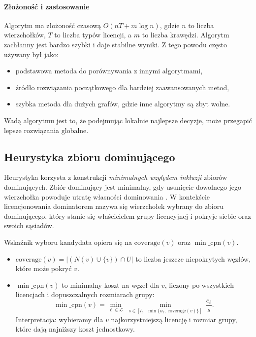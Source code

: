 \paragraph{Złożoność i zastosowanie}
Algorytm ma złożoność czasową $O(nT + m\log n)$, gdzie $n$ to liczba wierzchołków, $T$ to liczba typów licencji, a $m$ to liczba krawędzi.
Algorytm zachłanny jest bardzo szybki i daje stabilne wyniki. Z tego powodu często używany był jako:
\begin{itemize}
  \item podstawowa metoda do porównywania z innymi algorytmami,
  \item źródło rozwiązania początkowego dla bardziej zaawansowanych metod,
  \item szybka metoda dla dużych grafów, gdzie inne algorytmy są zbyt wolne.
\end{itemize}
Wadą algorytmu jest to, że podejmując lokalnie najlepsze decyzje, może przegapić lepsze rozwiązania globalne.
\subsection{Heurystyka zbioru dominującego}\label{subsec:ds}

Heurystyka korzysta z konstrukcji \emph{minimalnych względem inkluzji} zbiorów dominujących. Zbiór dominujący jest minimalny, gdy usunięcie dowolnego jego wierzchołka powoduje utratę własności dominowania \cite{haynes1998domination}. W kontekście licencjonowania dominatorem nazywa się wierzchołek wybrany do zbioru dominującego, który stanie się właścicielem grupy licencyjnej i pokryje siebie oraz swoich sąsiadów.

Wskaźnik wyboru kandydata opiera się na \(\mathrm{coverage}(v)\) oraz \(\min\_\mathrm{cpn}(v)\).
\begin{itemize}
  \item \(\mathrm{coverage}(v)=|(N(v)\cup\{v\})\cap U|\) to liczba jeszcze niepokrytych węzłów, które może pokryć \(v\).
  \item \(\min\_\mathrm{cpn}(v)\) to minimalny koszt na węzeł dla \(v\), liczony po wszystkich licencjach i dopuszczalnych rozmiarach grupy:
        \[
          \min\_\mathrm{cpn}(v)=\min_{\ell\in\mathcal{L}}\;\min_{s\in[l_\ell,\;\min\{u_\ell,\ \mathrm{coverage}(v)\}]}\ \frac{c_\ell}{s}.
        \]
        Interpretacja: wybieramy dla \(v\) najkorzystniejszą licencję i rozmiar grupy, które dają najniższy koszt jednostkowy.
\end{itemize}

